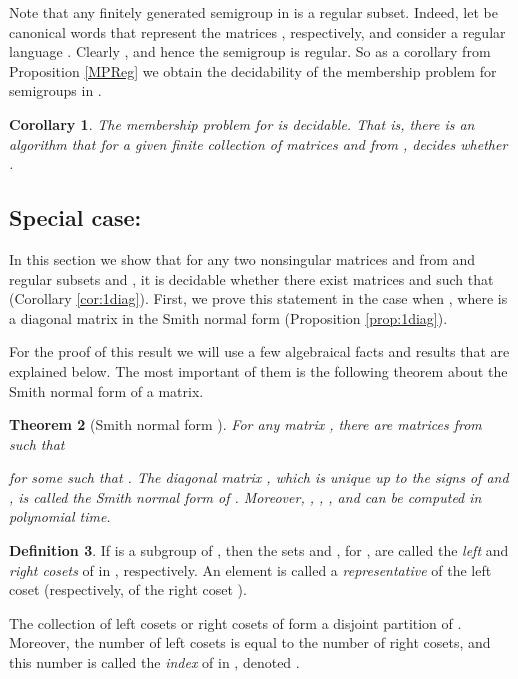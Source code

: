 \documentclass[fontsize=11pt,DIV=13,paper=letter]{scrartcl}
\newtheorem{theorem}{Theorem}\newtheorem{proposition}[theorem]{Proposition}
\newtheorem{corollary}[theorem]{Corollary}
\theoremstyle{definition}
\newtheorem{definition}[theorem]{Definition}
\begin{document}
Note that any finitely generated semigroup  in  is a regular subset. Indeed, let  be canonical words that represent the matrices , respectively, and consider a regular language . Clearly , and hence the semigroup  is regular.
So as a corollary from Proposition \ref{MPReg} we obtain the decidability of the membership problem for semigroups in .

\begin{corollary}\label{cor:GL}
The membership problem for  is decidable. That is, there is an algorithm that for a given finite collection of matrices  and  from , decides whether .
\end{corollary}

\subsection{Special case: }\label{1mat}

In this section we show that for any two nonsingular matrices  and  from  and regular subsets  and , it is decidable whether there exist matrices  and  such that  (Corollary \ref{cor:1diag}). First, we prove this statement in the case when , where  is a diagonal matrix in the Smith normal form (Proposition \ref{prop:1diag}).

For the proof of this result we will use a few algebraical facts and results that are explained below. The most important of them is the following theorem about the Smith normal form of a matrix.

\begin{theorem}[Smith normal form \cite{KB79}] \label{SNF}
For any matrix , there are matrices  from  such that

for some  such that . The diagonal matrix , which is unique up to the signs of  and , is called the \emph{Smith normal form} of . Moreover, , , , and  can be computed in polynomial time.
\end{theorem}

\begin{definition}
If  is a subgroup of , then the sets  and , for , are called the \emph{left} and \emph{right cosets} of  in , respectively. An element  is called a \emph{representative} of the left coset  (respectively, of the right coset ).

The collection of left cosets or right cosets of  form a disjoint partition of . Moreover, the number of left cosets is equal to the number of right cosets, and this number is called the \emph{index} of  in , denoted . 
\end{definition}
\end{document}
